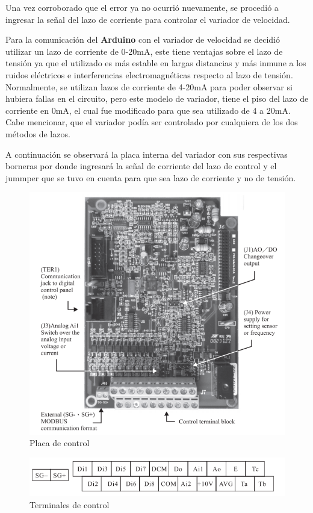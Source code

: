 Una vez corroborado que el error ya no ocurrió nuevamente, se procedió a ingresar la señal del lazo de corriente para controlar el variador de velocidad.

Para la comunicación del \textbf{Arduino} con el variador de velocidad se decidió utilizar un lazo de corriente de 0-20mA, este tiene ventajas sobre el lazo de tensión ya que el utilizado es más estable en largas distancias y más inmune a los ruidos eléctricos e interferencias electromagnéticas respecto al lazo de tensión. Normalmente, se utilizan lazos de corriente de 4-20mA para poder observar si hubiera fallas en el circuito, pero este modelo de variador, tiene el piso del lazo de corriente en 0mA, el cual fue modificado para que sea utilizado de 4 a 20mA. Cabe mencionar, que el variador podía ser controlado por cualquiera de los dos métodos de lazos.

A continuación se observará la placa interna del variador con sus respectivas borneras por donde ingresará la señal de corriente del lazo de control y el jummper que se tuvo en cuenta para que sea lazo de corriente y no de tensión.

\begin{figure}[htbp]
	\centering
\includegraphics[width=0.7\linewidth]{imagenes/placa_ls}
\caption{Placa de control}
\label{fig:placals}
\end{figure}


\begin{figure}[h]
	\centering
	\includegraphics[width=0.7\linewidth]{imagenes/terminales.png}
	\caption{Terminales de control}
	\label{fig:born}
\end{figure}

